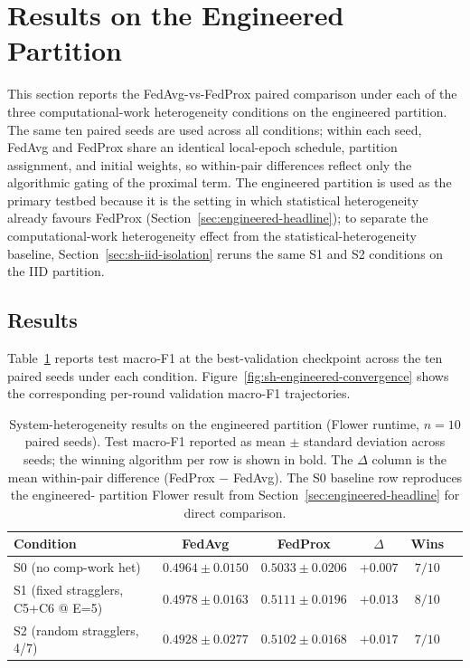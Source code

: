 \documentclass[11pt,a4paper]{report}
\begin{document}
\section{Results on the Engineered Partition}
\label{sec:sh-engineered-results}

This section reports the FedAvg-vs-FedProx paired comparison
under each of the three computational-work heterogeneity
conditions on the engineered partition. The same ten paired seeds
are used across all conditions; within each seed, FedAvg and
FedProx share an identical local-epoch schedule, partition
assignment, and initial weights, so within-pair differences
reflect only the algorithmic gating of the proximal term. The
engineered partition is used as the primary testbed because it
is the setting in which statistical heterogeneity already
favours FedProx (Section~\ref{sec:engineered-headline}); to
separate the computational-work heterogeneity effect from the
statistical-heterogeneity baseline, Section~\ref{sec:sh-iid-isolation}
reruns the same S1 and S2 conditions on the IID partition.

\subsection{Results}
\label{sec:sh-engineered-table}

Table~\ref{tab:sh-engineered} reports test macro-F1 at the
best-validation checkpoint across the ten paired seeds under
each condition. Figure~\ref{fig:sh-engineered-convergence}
shows the corresponding per-round validation macro-F1
trajectories.

\begin{table}[!htbp]
\centering
\caption{System-heterogeneity results on the engineered
partition (Flower runtime, $n = 10$ paired seeds). Test
macro-F1 reported as mean $\pm$ standard deviation across
seeds; the winning algorithm per row is shown in bold. The
$\Delta$ column is the mean within-pair difference (FedProx
$-$ FedAvg). The S0 baseline row reproduces the engineered-
partition Flower result from
Section~\ref{sec:engineered-headline} for direct comparison.}
\label{tab:sh-engineered}
\small
\begin{tabular}{lccccc}
\toprule
Condition & FedAvg & FedProx & $\Delta$ & Wins \\
\midrule
S0 (no comp-work het)                & $0.4964 \pm 0.0150$ & $\mathbf{0.5033 \pm 0.0206}$ & $+0.007$ & $7/10$ \\
S1 (fixed stragglers, C5+C6 @ E=5) & $0.4978 \pm 0.0163$ & $\mathbf{0.5111 \pm 0.0196}$ & $+0.013$ & $8/10$ \\
S2 (random stragglers, 4/7)        & $0.4928 \pm 0.0277$ & $\mathbf{0.5102 \pm 0.0168}$ & $+0.017$ & $7/10$ \\
\bottomrule
\end{tabular}
\end{table}
\end{document}
